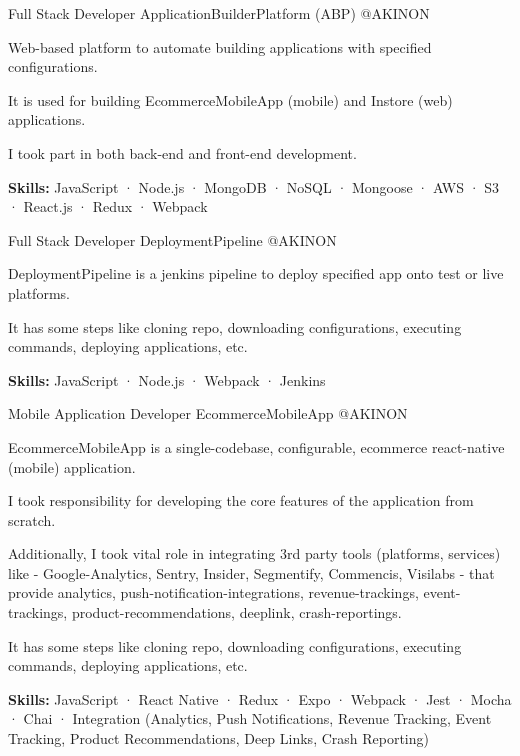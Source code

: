\begin{cventries}
  \cventry
    {Full Stack Developer} %
    {ApplicationBuilderPlatform (ABP)} %
    {@AKINON} %
    {}
    {
      \begin{cvitems} %
        \item {Web-based platform to automate building applications with specified configurations.}
        \item {It is used for building EcommerceMobileApp (mobile) and Instore (web) applications.}
        \item {I took part in both back-end and front-end development.}
        \item {\textbf {Skills:} JavaScript · Node.js · MongoDB · NoSQL · Mongoose · AWS · S3 · React.js · Redux · Webpack}
      \end{cvitems}
    }

  \cventry
    {Full Stack Developer} %
    {DeploymentPipeline} %
    {@AKINON} %
    {}
    {
      \begin{cvitems} %
        \item {DeploymentPipeline is a jenkins pipeline to deploy specified app onto test or live platforms.}
        \item {It has some steps like cloning repo, downloading configurations, executing commands, deploying applications, etc.}
        \item {\textbf {Skills:} JavaScript · Node.js · Webpack · Jenkins}
      \end{cvitems}
    }

  \cventry
    {Mobile Application Developer} %
    {EcommerceMobileApp} %
    {@AKINON} %
    {}
    {
      \begin{cvitems} %
        \item {EcommerceMobileApp is a single-codebase, configurable, ecommerce react-native (mobile) application.}
        \item {I took responsibility for developing the core features of the application from scratch.}
        \item {Additionally, I took vital role in integrating 3rd party tools (platforms, services) like - Google-Analytics, Sentry, Insider, Segmentify, Commencis, Visilabs - that provide analytics, push-notification-integrations, revenue-trackings, event-trackings, product-recommendations, deeplink, crash-reportings.}
        \item {It has some steps like cloning repo, downloading configurations, executing commands, deploying applications, etc.}
        \item {\textbf {Skills:} JavaScript · React Native · Redux · Expo · Webpack · Jest · Mocha · Chai · Integration (Analytics, Push Notifications, Revenue Tracking, Event Tracking, Product Recommendations, Deep Links, Crash Reporting)}
      \end{cvitems}
    }


\end{cventries}
